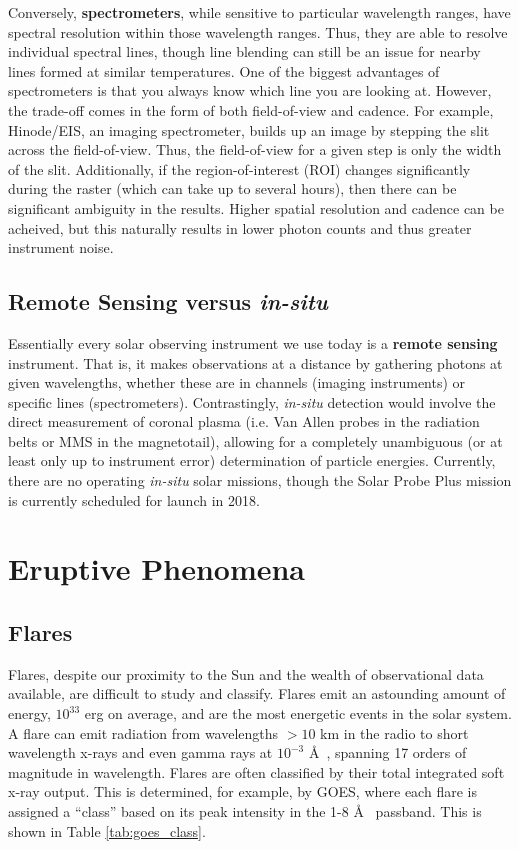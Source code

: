 	Conversely, \textbf{spectrometers}, while sensitive to particular wavelength ranges, have spectral resolution within those wavelength ranges. Thus, they are able to resolve individual spectral lines, though line blending can still be an issue for nearby lines formed at similar temperatures. One of the biggest advantages of spectrometers is that you always know which line you are looking at. However, the trade-off comes in the form of both field-of-view and cadence. For example, Hinode/EIS, an imaging spectrometer, builds up an image by stepping the slit across the field-of-view. Thus, the field-of-view for a given step is only the width of the slit. Additionally, if the region-of-interest (ROI) changes significantly during the raster (which can take up to several hours), then there can be significant ambiguity in the results. Higher spatial resolution and cadence can be acheived, but this naturally results in lower photon counts and thus greater instrument noise. 

	\subsection{Remote Sensing versus \textit{in-situ}}
	Essentially every solar observing instrument we use today is a \textbf{remote sensing} instrument. That is, it makes observations at a distance by gathering photons at given wavelengths, whether these are in channels (imaging instruments) or specific lines (spectrometers). Contrastingly, \textit{in-situ} detection would involve the direct measurement of coronal plasma (i.e. Van Allen probes in the radiation belts or MMS in the magnetotail), allowing for a completely unambiguous (or at least only up to instrument error) determination of particle energies. Currently, there are no operating \textit{in-situ} solar missions, though the Solar Probe Plus mission is currently scheduled for launch in 2018.

\section{Eruptive Phenomena}

	\subsection{Flares}
	\citep[see][Ch. 10]{golub_solar_2010}
	Flares, despite our proximity to the Sun and the wealth of observational data available, are difficult to study and classify. Flares emit an astounding amount of energy, $10^{33}$ erg on average, and are the most energetic events in the solar system. A flare can emit radiation from wavelengths $>10$ km in the radio to short wavelength x-rays and even gamma rays at $10^{-3}$ \AA~, spanning 17 orders of magnitude in wavelength. Flares are often classified by their total integrated soft x-ray output. This is determined, for example, by GOES, where each flare is assigned a ``class'' based on its peak intensity in the 1-8 \AA~ passband. This is shown in Table \ref{tab:goes_class}.

